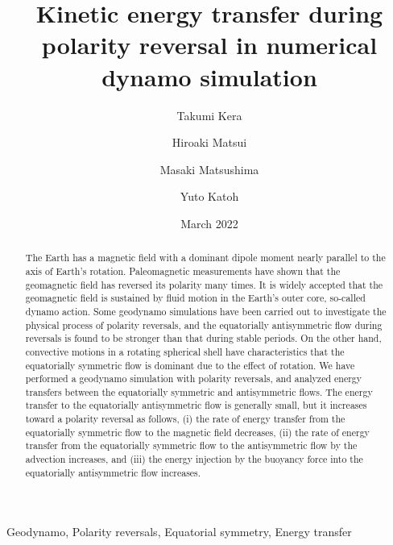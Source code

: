\documentclass[review]{elsarticle}
\date{March 2022}
\begin{document}
\title{Kinetic energy transfer during polarity reversal in numerical dynamo simulation}

\author[Tohoku]{Takumi Kera}
\author[ucd]{Hiroaki Matsui}
\author[TITECH]{Masaki Matsushima}
\author[Tohoku]{Yuto Katoh}

\address[Tohoku]{Department of Geophysics, Tohoku University, Sendai, Japan.}
\address[ucd]{Department of the Earth and Planetary Sciences, University of California, Davis, CA, USA.}
\address[TITECH]{Department of Earth and Planetary Sciences, Tokyo Institute of Technology, Tokyo, Japan.}

\begin{keyword}
Geodynamo, 
{\color{red} 
Polarity reversals, Equatorial symmetry, Energy transfer
}
\end{keyword}

\begin{abstract}
The Earth has a magnetic field with a dominant dipole moment nearly parallel to the axis of Earth’s rotation. 
Paleomagnetic measurements have shown that the geomagnetic field has reversed its polarity many times. It is widely accepted that the geomagnetic field is sustained by fluid motion in the Earth’s outer core, so-called dynamo action. 
Some geodynamo simulations have been carried out to investigate the physical process of polarity reversals, and the equatorially antisymmetric flow during reversals is found to be stronger than that during stable periods. 
On the other hand, convective motions in a rotating spherical shell have characteristics that the equatorially symmetric flow is dominant due to the effect of rotation. 
We have performed a geodynamo simulation with polarity reversals, and analyzed energy transfers between the equatorially symmetric and antisymmetric flows.
{\color{red}
The energy transfer to the equatorially antisymmetric flow is generally small, but it increases toward a polarity reversal as follows, (i) the rate of energy transfer from the equatorially symmetric flow to the magnetic field decreases, (ii) the rate of energy transfer from the equatorially symmetric flow to the antisymmetric flow by the advection increases, and (iii) the energy injection by the buoyancy force into the equatorially antisymmetric flow increases.
}
\end{abstract}
\end{document}
